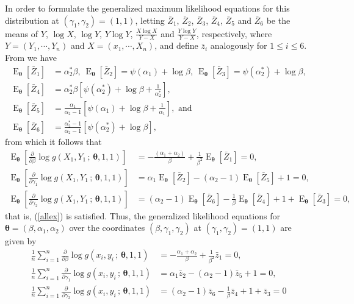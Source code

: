 \documentclass[12pt]{article} %
\newcommand{\bs}{\boldsymbol}
\newcommand{\on}{\operatorname}
\theoremstyle{definition}
\begin{document}
In order to formulate the generalized maximum likelihood equations for this distribution at $(\gamma_1,\gamma_2)=(1,1)$, letting $\bar{Z}_1$, $\bar{Z}_2$, $\bar{Z}_3$, $\bar{Z}_4$, $\bar{Z}_5$ and $\bar{Z}_6$ be the means of $Y$, $\log X$, $\log Y$, $Y\log Y$, $\frac{X \log X}{Y-X}$ and $\frac{Y \log Y}{Y-X}$, respectively, where $Y=(Y_1,\cdots,Y_n)$ and $X=(x_1,\cdots,X_n)$, and define $\bar{z}_i$ analogously for $1\leq i\leq 6$. From \cite{2022-Zhao} we have
\begin{equation}\label{relations3}
\begin{aligned}
\on{E}_{\bs{\theta}}\left[\bar{Z}_1\right] &= \alpha_2^*\beta,\ 
\on{E}_{\bs{\theta}}\left[\bar{Z}_2\right] = \psi(\alpha_1) + \log \beta,\ \on{E}_{\bs{\theta}}\left[\bar{Z}_3\right] = \psi(\alpha_2^*) + \log \beta,\\ 
\on{E}_{\bs{\theta}}\left[\bar{Z}_4\right] &= \alpha_2^*\beta \left[\psi(\alpha_2^*) + \log \beta + \frac{1}{\alpha_2^*}\right],\\
\on{E}_{\bs{\theta}}\left[\bar{Z}_5\right] &= \frac{\alpha_1}{\alpha_2 - 1}\left[\psi(\alpha_1) + \log \beta + \frac{1}{\alpha_1}\right],\mbox{ and}\\
\on{E}_{\bs{\theta}}\left[\bar{Z}_6\right] &= \frac{\alpha_2^*-1}{\alpha_2 - 1}\left[\psi(\alpha_2^*) + \log \beta\right],
\end{aligned}
\end{equation}
from which it follows that
\begin{align*}
\on{E}_{\bs{\theta}} \left[\frac{\partial}{\partial \beta}  \log g(X_1,Y_1\,;\,\bs{\theta},1,1)\right] &= -\frac{(\alpha_1 + \alpha_2)}{\beta} + \frac{1}{\beta^2} \on{E}_{\bs{\theta}}[\bar{Z}_1] = 0, \\
\on{E}_{\bs{\theta}} \left[\frac{\partial}{\partial \gamma_1}  \log g(X_1,Y_1\,;\,\bs{\theta},1,1)\right] &= \alpha_1 \on{E}_{\bs{\theta}}[ \bar{Z}_2] - (\alpha_2 - 1) \on{E}_{\bs{\theta}}\left[\bar{Z}_5\right] + 1 = 0, \\
\on{E}_{\bs{\theta}} \left[\frac{\partial}{\partial \gamma_2}  \log g(X_1,Y_1\,;\,\bs{\theta},1,1)\right] &= (\alpha_2 - 1) \on{E}_{\bs{\theta}}\left[\bar{Z}_6\right] - \frac{1}{\beta} \on{E}_{\bs{\theta}}\left[\bar{Z}_4\right] + 1 + \on{E}_{\bs{\theta}}\left[\bar{Z}_3\right]=0,
\end{align*}
that is, (\ref{allex}) is satisfied. Thus, the generalized likelihood equations for $\bs{\theta}=(\beta,\alpha_1,\alpha_2)$ over the coordinates $(\beta, \gamma_1,\gamma_2)$ at $(\gamma_1,\gamma_2)=(1,1)$ are given by
\begin{align*}
\frac{1}{n}\sum_{i=1}^n\frac{\partial}{\partial \beta}  \log g(x_i,y_i\,;\,\bs{\theta},1,1) &= -\frac{\alpha_1 + \alpha_2}{\beta} + \frac{1}{\beta^2} \bar{z}_1 = 0, \\
\frac{1}{n}\sum_{i=1}^n\frac{\partial}{\partial \gamma_1}  \log g(x_i,y_i\,;\,\bs{\theta},1,1) &= \alpha_1 \bar{z}_2 - (\alpha_2 - 1) \bar{z}_5 + 1 = 0, \\
\frac{1}{n}\sum_{i=1}^n \frac{\partial}{\partial \gamma_2}  \log g(x_i,y_i\,;\,\bs{\theta},1,1) &= (\alpha_2 - 1) \bar{z}_6 - \frac{1}{\beta}\bar{z}_4 + 1 + \bar{z}_3 = 0
\end{align*}
\end{document}
